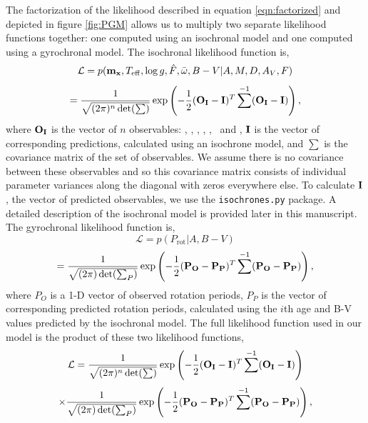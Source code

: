 The factorization of the likelihood described in equation \ref{eqn:factorized}
and depicted in figure \ref{fig:PGM} allows us to multiply two separate
likelihood functions together: one computed using an isochronal model and one
computed using a gyrochronal model.
The isochronal likelihood function is,
\begin{equation}
\mathcal{L} = p({\bf m_x}, T_{\mathrm{eff}}, \log g, \hat{F}, \bar{\omega}, B-V|A, M, D,
    A_V, F) \nonumber
\end{equation}
\begin{equation}
    = \frac{1}{\sqrt{(2\pi)^n \det(\sum)}}
    \exp\left( -\frac{1}{2} ({\bf O_I} - {\bf I})^T \sum ^{-1}
    ({\bf O_I} - {\bf I})\right),
\end{equation}
\label{fig:iso_likelihood}
where ${\bf O_I}$ is the vector of $n$ observables: \teff, \logg, \fhat,
\pmega, \mj, \mh\ and \mk, ${\bf I}$ is the vector of corresponding
predictions, calculated using an isochrone model, and $\sum$ is the covariance
matrix of the set of observables.
We assume there is no covariance between these observables and so this
covariance matrix consists of individual parameter variances along the
diagonal with zeros everywhere else.
To calculate ${\bf I}$, the vector of predicted observables, we use the
{\tt isochrones.py} package.
A detailed description of the isochronal model is provided later in this
manuscript.
The gyrochronal likelihood function is,
\begin{equation}
\mathcal{L} = p(P_{\mathrm{rot}}|A, B-V) \nonumber
\end{equation}
\begin{equation}
    = \frac{1}{\sqrt{(2\pi) \det(\sum_P)}}
    \exp\left( -\frac{1}{2} ({\bf P_O} - {\bf P_P})^T \sum ^{-1}
    ({\bf P_O} - {\bf P_P})\right),
\end{equation}
\label{eqn:gyro_likelihood}
where $P_O$ is a 1-D vector of observed rotation periods, $P_P$ is the vector
of corresponding predicted rotation periods, calculated using the $i$th age
and B-V values predicted by the isochronal model.
The full likelihood function used in our model is the product of these two
likelihood functions,
\begin{equation}
    \mathcal{L} = \frac{1}{\sqrt{(2\pi)^n \det(\sum)}}
    \exp\left( -\frac{1}{2} ({\bf O_I} - {\bf I})^T \sum ^{-1}
    ({\bf O_I} - {\bf I})\right) \nonumber
\end{equation}
\begin{equation}
    \times
    \frac{1}{\sqrt{(2\pi) \det(\sum_P)}}
    \exp\left( -\frac{1}{2} ({\bf P_O} - {\bf P_P})^T \sum ^{-1}
    ({\bf P_O} - {\bf P_P})\right),
\end{equation}

